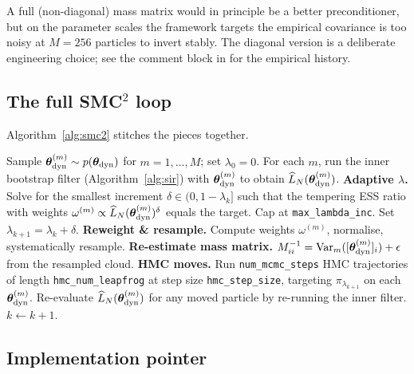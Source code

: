 A full (non-diagonal) mass matrix would in principle be a better
preconditioner, but on the parameter scales the framework targets the
empirical covariance is too noisy at $M = 256$ particles to invert
stably. The diagonal version is a deliberate engineering choice; see
the comment block in  for the empirical history.

\subsection{The full SMC$^2$ loop}

Algorithm~\ref{alg:smc2} stitches the pieces together.

\begin{algorithm}[H]
\caption{Adaptive-tempered SMC$^2$ over $\thetadyn$}
\label{alg:smc2}
\begin{algorithmic}[1]
\State Sample $\bm{\theta}_{\rm dyn}^{(m)} \sim p(\bm{\theta}_{\rm dyn})$ for $m = 1, \ldots, M$;
       set $\lambda_0 = 0$.
\State For each $m$, run the inner bootstrap filter
       (Algorithm~\ref{alg:sir}) with $\bm{\theta}_{\rm dyn}^{(m)}$ to obtain
       $\widehat{L}_N(\bm{\theta}_{\rm dyn}^{(m)})$.
  \State \textbf{Adaptive $\lambda$.} Solve for the smallest increment
         $\delta \in (0, 1 - \lambda_k]$ such that the tempering ESS
         ratio with weights
         $\omega^{(m)} \propto \widehat{L}_N(\bm{\theta}_{\rm dyn}^{(m)})^{\delta}$ equals
         the target. Cap at \texttt{max\_lambda\_inc}. Set
         $\lambda_{k+1} = \lambda_k + \delta$.
  \State \textbf{Reweight \& resample.} Compute weights
         $\omega^{(m)}$, normalise, systematically resample.
  \State \textbf{Re-estimate mass matrix.} $M^{-1}_{ii} =
         \mathrm{Var}_m([\bm{\theta}_{\rm dyn}^{(m)}]_i) + \epsilon$ from the
         resampled cloud.
  \State \textbf{HMC moves.} Run \texttt{num\_mcmc\_steps} HMC
         trajectories of length \texttt{hmc\_num\_leapfrog} at step
         size \texttt{hmc\_step\_size}, targeting $\pi_{\lambda_{k+1}}$
         on each $\bm{\theta}_{\rm dyn}^{(m)}$. Re-evaluate
         $\widehat{L}_N(\bm{\theta}_{\rm dyn}^{(m)})$ for any moved particle by
         re-running the inner filter.
  \State $k \leftarrow k + 1$.
\EndWhile
\end{algorithmic}
\end{algorithm}

\subsection{Implementation pointer}

